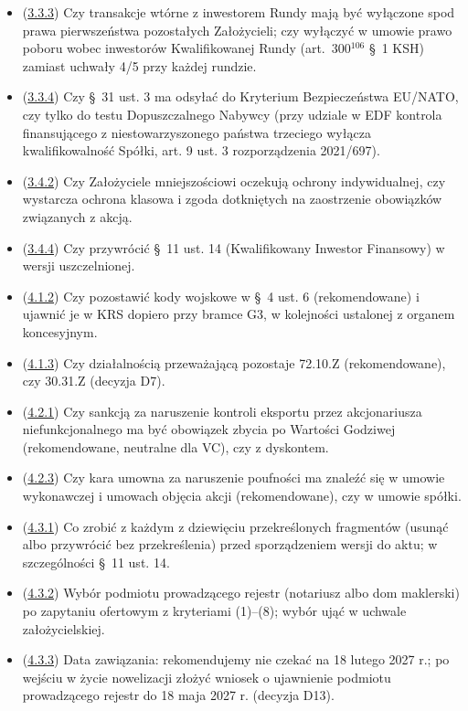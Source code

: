 \documentclass[12pt,a4paper]{report}
\begin{document}
\begin{itemize}
  \item (\hyperref[memo:3.3.3]{3.3.3}) Czy transakcje wtórne z inwestorem Rundy mają być wyłączone spod prawa pierwszeństwa pozostałych Założycieli; czy wyłączyć w umowie prawo poboru wobec inwestorów Kwalifikowanej Rundy (art.~300$^{106}$ §~1 KSH) zamiast uchwały 4/5 przy każdej rundzie.
  \item (\hyperref[memo:3.3.4]{3.3.4}) Czy §~31 ust. 3 ma odsyłać do Kryterium Bezpieczeństwa EU/NATO, czy tylko do testu Dopuszczalnego Nabywcy (przy udziale w EDF kontrola finansującego z niestowarzyszonego państwa trzeciego wyłącza kwalifikowalność Spółki, art. 9 ust. 3 rozporządzenia 2021/697).
  \item (\hyperref[memo:3.4.2]{3.4.2}) Czy Założyciele mniejszościowi oczekują ochrony indywidualnej, czy wystarcza ochrona klasowa i zgoda dotkniętych na zaostrzenie obowiązków związanych z akcją.
  \item (\hyperref[memo:3.4.4]{3.4.4}) Czy przywrócić §~11 ust. 14 (Kwalifikowany Inwestor Finansowy) w wersji uszczelnionej.
  \item (\hyperref[memo:4.1.2]{4.1.2}) Czy pozostawić kody wojskowe w §~4 ust. 6 (rekomendowane) i ujawnić je w KRS dopiero przy bramce G3, w kolejności ustalonej z organem koncesyjnym.
  \item (\hyperref[memo:4.1.3]{4.1.3}) Czy działalnością przeważającą pozostaje 72.10.Z (rekomendowane), czy 30.31.Z (decyzja D7).
  \item (\hyperref[memo:4.2.1]{4.2.1}) Czy sankcją za naruszenie kontroli eksportu przez akcjonariusza niefunkcjonalnego ma być obowiązek zbycia po Wartości Godziwej (rekomendowane, neutralne dla VC), czy z dyskontem.
  \item (\hyperref[memo:4.2.3]{4.2.3}) Czy kara umowna za naruszenie poufności ma znaleźć się w umowie wykonawczej i umowach objęcia akcji (rekomendowane), czy w umowie spółki.
  \item (\hyperref[memo:4.3.1]{4.3.1}) Co zrobić z każdym z dziewięciu przekreślonych fragmentów (usunąć albo przywrócić bez przekreślenia) przed sporządzeniem wersji do aktu; w szczególności §~11 ust. 14.
  \item (\hyperref[memo:4.3.2]{4.3.2}) Wybór podmiotu prowadzącego rejestr (notariusz albo dom maklerski) po zapytaniu ofertowym z kryteriami (1)--(8); wybór ująć w uchwale założycielskiej.
  \item (\hyperref[memo:4.3.3]{4.3.3}) Data zawiązania: rekomendujemy nie czekać na 18 lutego 2027 r.; po wejściu w życie nowelizacji złożyć wniosek o ujawnienie podmiotu prowadzącego rejestr do 18 maja 2027 r. (decyzja D13).

\end{itemize}
\end{document}
